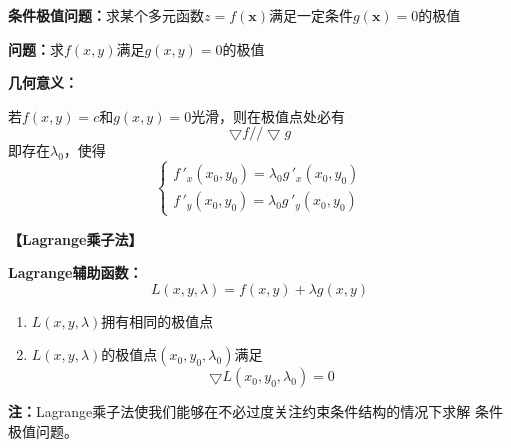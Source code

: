 {\bf 条件极值问题：}求某个多元函数$z=f(\bm{x})$满足一定条件$g(\bm{x})=0$的极值

{\bf 问题：}求$f(x,y)$满足$g(x,y)=0$的极值

{\bf 几何意义：}

\begin{center}
\end{center}

若$f(x,y)=c$和$g(x,y)=0$光滑，则在极值点处必有
$${\bigtriangledown f // \bigtriangledown g}$$
即存在$\lambda_0$，使得
$$
{\left\{\begin{array}{l}
	f\,'_x(x_0,y_0)=\lambda_0g\,'_x(x_0,y_0)\\
	f\,'_y(x_0,y_0)=\lambda_0g\,'_y(x_0,y_0)
\end{array}
\right.}$$

{\bf 【Lagrange乘子法】}

{\bf Lagrange辅助函数：}
$${L(x,y,\lambda)=f(x,y)+\lambda g(x,y)}$$

\begin{enumerate}[(1)]
  \setlength{\itemindent}{1cm}
  \item $L(x,y,\lambda)$拥有相同的极值点 
  \item $L(x,y,\lambda)$的极值点$(x_0,y_0,\lambda_0)$满足 
  $$\bigtriangledown L(x_0,y_0,\lambda_0)=0$$
\end{enumerate}

{\bf 注：}Lagrange乘子法使我们能够在不必过度关注约束条件结构的情况下求解
条件极值问题。

